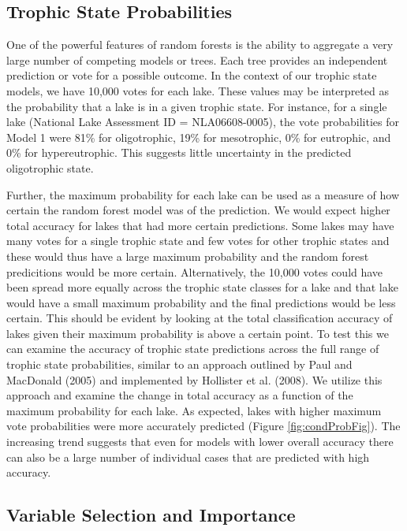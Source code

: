 \documentclass[11pt,]{article}
\begin{document}
\subsection{Trophic State
Probabilities}\label{trophic-state-probabilities}

One of the powerful features of random forests is the ability to
aggregate a very large number of competing models or trees. Each tree
provides an independent prediction or vote for a possible outcome. In
the context of our trophic state models, we have 10,000 votes for each
lake. These values may be interpreted as the probability that a lake is
in a given trophic state. For instance, for a single lake (National Lake
Assessment ID = NLA06608-0005), the vote probabilities for Model 1 were
81\% for oligotrophic, 19\% for mesotrophic, 0\% for eutrophic, and 0\%
for hypereutrophic. This suggests little uncertainty in the predicted
oligotrophic state.

Further, the maximum probability for each lake can be used as a measure
of how certain the random forest model was of the prediction. We would
expect higher total accuracy for lakes that had more certain
predictions. Some lakes may have many votes for a single trophic state
and few votes for other trophic states and these would thus have a large
maximum probability and the random forest predicitions would be more
certain. Alternatively, the 10,000 votes could have been spread more
equally across the trophic state classes for a lake and that lake would
have a small maximum probability and the final predictions would be less
certain. This should be evident by looking at the total classification
accuracy of lakes given their maximum probability is above a certain
point. To test this we can examine the accuracy of trophic state
predictions across the full range of trophic state probabilities,
similar to an approach outlined by Paul and MacDonald (2005) and
implemented by Hollister et al. (2008). We utilize this approach and
examine the change in total accuracy as a function of the maximum
probability for each lake. As expected, lakes with higher maximum vote
probabilities were more accurately predicted (Figure
\ref{fig:condProbFig}). The increasing trend suggests that even for
models with lower overall accuracy there can also be a large number of
individual cases that are predicted with high accuracy.

\subsection{Variable Selection and
Importance}\label{variable-selection-and-importance}
\end{document}
